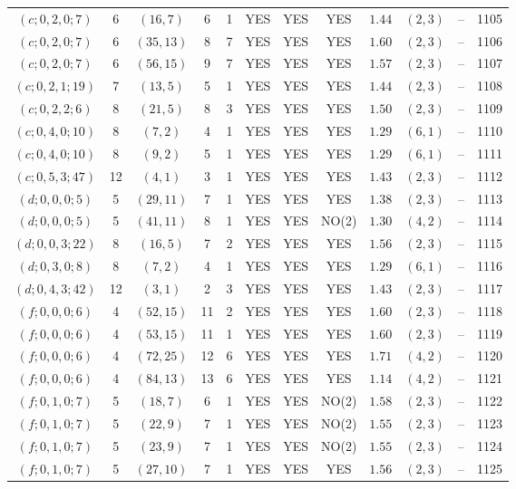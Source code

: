 \begin{longtable}{|c|c|c|c|c|c|c|c|c|c|c|c|}
$(c;0,2,0;7)$ & 6 & $(16,7)$ & 6 & 1 & YES & YES & YES & $1.44$ & $(2,3)$ & -- & 1105\\
$(c;0,2,0;7)$ & 6 & $(35,13)$ & 8 & 7 & YES & YES & YES & $1.60$ & $(2,3)$ & -- & 1106\\
$(c;0,2,0;7)$ & 6 & $(56,15)$ & 9 & 7 & YES & YES & YES & $1.57$ & $(2,3)$ & -- & 1107\\
$(c;0,2,1;19)$ & 7 & $(13,5)$ & 5 & 1 & YES & YES & YES & $1.44$ & $(2,3)$ & -- & 1108\\
$(c;0,2,2;6)$ & 8 & $(21,5)$ & 8 & 3 & YES & YES & YES & $1.50$ & $(2,3)$ & -- & 1109\\
$(c;0,4,0;10)$ & 8 & $(7,2)$ & 4 & 1 & YES & YES & YES & $1.29$ & $(6,1)$ & -- & 1110\\
$(c;0,4,0;10)$ & 8 & $(9,2)$ & 5 & 1 & YES & YES & YES & $1.29$ & $(6,1)$ & -- & 1111\\
$(c;0,5,3;47)$ & 12 & $(4,1)$ & 3 & 1 & YES & YES & YES & $1.43$ & $(2,3)$ & -- & 1112\\
$(d;0,0,0;5)$ & 5 & $(29,11)$ & 7 & 1 & YES & YES & YES & $1.38$ & $(2,3)$ & -- & 1113\\
$(d;0,0,0;5)$ & 5 & $(41,11)$ & 8 & 1 & YES & YES & NO(2) & $1.30$ & $(4,2)$ & -- & 1114\\
$(d;0,0,3;22)$ & 8 & $(16,5)$ & 7 & 2 & YES & YES & YES & $1.56$ & $(2,3)$ & -- & 1115\\
$(d;0,3,0;8)$ & 8 & $(7,2)$ & 4 & 1 & YES & YES & YES & $1.29$ & $(6,1)$ & -- & 1116\\
$(d;0,4,3;42)$ & 12 & $(3,1)$ & 2 & 3 & YES & YES & YES & $1.43$ & $(2,3)$ & -- & 1117\\
$(f;0,0,0;6)$ & 4 & $(52,15)$ & 11 & 2 & YES & YES & YES & $1.60$ & $(2,3)$ & -- & 1118\\
$(f;0,0,0;6)$ & 4 & $(53,15)$ & 11 & 1 & YES & YES & YES & $1.60$ & $(2,3)$ & -- & 1119\\
$(f;0,0,0;6)$ & 4 & $(72,25)$ & 12 & 6 & YES & YES & YES & $1.71$ & $(4,2)$ & -- & 1120\\
$(f;0,0,0;6)$ & 4 & $(84,13)$ & 13 & 6 & YES & YES & YES & $1.14$ & $(4,2)$ & -- & 1121\\
$(f;0,1,0;7)$ & 5 & $(18,7)$ & 6 & 1 & YES & YES & NO(2) & $1.58$ & $(2,3)$ & -- & 1122\\
$(f;0,1,0;7)$ & 5 & $(22,9)$ & 7 & 1 & YES & YES & NO(2) & $1.55$ & $(2,3)$ & -- & 1123\\
$(f;0,1,0;7)$ & 5 & $(23,9)$ & 7 & 1 & YES & YES & NO(2) & $1.55$ & $(2,3)$ & -- & 1124\\
$(f;0,1,0;7)$ & 5 & $(27,10)$ & 7 & 1 & YES & YES & YES & $1.56$ & $(2,3)$ & -- & 1125\\

\end{longtable}
